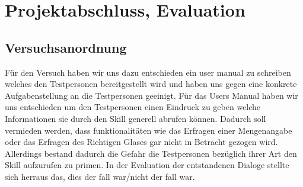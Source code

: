 \documentclass[12pt,letterpaper]{article}
\begin{document}
\section{Projektabschluss, Evaluation}
\subsection{Versuchsanordnung}
Für den Versuch haben wir uns dazu entschieden ein user manual zu schreiben welches den Testpersonen
bereitgestellt wird und haben uns gegen eine konkrete Aufgabenstellung an die Testpersonen geeinigt. Für das Users Manual haben wir uns entschieden um den Testpersonen einen Eindruck zu geben welche Informationen sie durch den Skill generell abrufen können. Dadurch soll vermieden werden, dass funktionalitäten wie das Erfragen einer Mengenangabe oder das Erfragen des Richtigen Glases gar nicht in Betracht gezogen wird. Allerdings bestand dadurch die Gefahr die Testpersonen bezüglich ihrer Art den Skill aufzurufen zu primen.
In der Evaluation der entstandenen Dialoge stellte sich herraus das, dies der fall war/nicht der fall war.
\\
 
\end{document}
